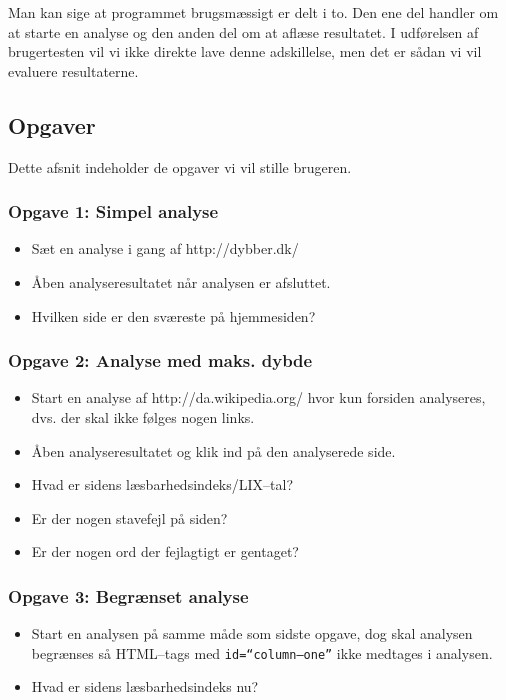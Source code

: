 \documentclass[a4paper,oneside]{memoir}
\begin{document}
Man kan sige at programmet brugsmæssigt er delt i to. Den ene del
handler om at starte en analyse og den anden del om at aflæse
resultatet. I udførelsen af brugertesten vil vi ikke direkte lave
denne adskillelse, men det er sådan vi vil evaluere resultaterne.

\subsection{Opgaver}
Dette afsnit indeholder de opgaver vi vil stille brugeren.

\subsubsection{Opgave 1: Simpel analyse}
\begin{itemize}
\item Sæt en analyse i gang af http://dybber.dk/
\item Åben analyseresultatet når analysen er afsluttet.
\item Hvilken side er den sværeste på hjemmesiden?
\end{itemize}

\subsubsection{Opgave 2: Analyse med maks. dybde}
\begin{itemize}
\item Start en analyse af http://da.wikipedia.org/ hvor kun forsiden
  analyseres, dvs. der skal ikke følges nogen links.
\item Åben analyseresultatet og klik ind på den analyserede side.
\item Hvad er sidens læsbarhedsindeks/LIX--tal?
\item Er der nogen stavefejl på siden?
\item Er der nogen ord der fejlagtigt er gentaget?
\end{itemize}

\subsubsection{Opgave 3: Begrænset analyse}
\begin{itemize}
\item Start en analysen på samme måde som sidste opgave, dog skal
  analysen begrænses så HTML--tags med \texttt{id=``column--one''} ikke
  medtages i analysen.
\item Hvad er sidens læsbarhedsindeks nu?
\end{itemize}
\end{document}

